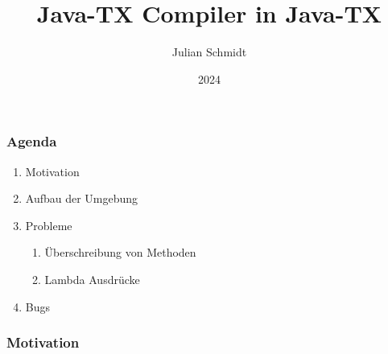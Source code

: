 \documentclass{beamer}
\title{Java-TX Compiler in Java-TX}
\author{Julian Schmidt}
\institute{DHBW Stuttgart}
\date{2024}
\begin{document}
\maketitle

\begin{frame}
\frametitle{Agenda}
\begin{enumerate}
    \item<1-> Motivation
    \item<2-> Aufbau der Umgebung
    \item<3-> Probleme
    \begin{enumerate}
        \item<3-> Überschreibung von Methoden
        \item<3-> Lambda Ausdrücke
    \end{enumerate}
    \item<4-> Bugs
\end{enumerate}
\end{frame}

\begin{frame}
\frametitle{Motivation}





\end{frame}
\end{document}
